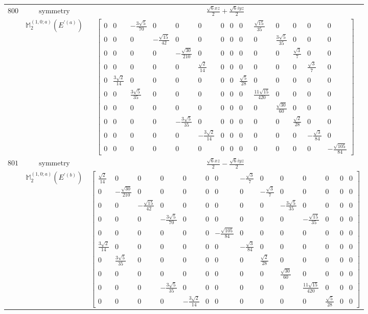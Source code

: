 \documentclass[fleqn,8pt,landscape]{jsarticle}
\begin{document}
\begin{longtable}{ccc}
$ 800 $ & $ \text{symmetry} $ & $ \frac{\sqrt{6} x z}{2} + \frac{\sqrt{6} i y z}{2} $ \\
$  $ & $ \mathbb{M}_{2}^{(1,0;a)}(E^{\prime(a)}) $ & $ \begin{bmatrix} 0 & 0 & - \frac{3 \sqrt{5}}{70} & 0 & 0 & 0 & 0 & 0 & 0 & \frac{\sqrt{15}}{35} & 0 & 0 & 0 & 0 \\ 0 & 0 & 0 & - \frac{\sqrt{15}}{42} & 0 & 0 & 0 & 0 & 0 & 0 & \frac{3 \sqrt{5}}{35} & 0 & 0 & 0 \\ 0 & 0 & 0 & 0 & - \frac{\sqrt{30}}{210} & 0 & 0 & 0 & 0 & 0 & 0 & \frac{\sqrt{3}}{7} & 0 & 0 \\ 0 & 0 & 0 & 0 & 0 & \frac{\sqrt{2}}{14} & 0 & 0 & 0 & 0 & 0 & 0 & \frac{\sqrt{3}}{7} & 0 \\ 0 & \frac{3 \sqrt{2}}{14} & 0 & 0 & 0 & 0 & 0 & 0 & \frac{\sqrt{5}}{28} & 0 & 0 & 0 & 0 & 0 \\ 0 & 0 & \frac{3 \sqrt{5}}{35} & 0 & 0 & 0 & 0 & 0 & 0 & \frac{11 \sqrt{15}}{420} & 0 & 0 & 0 & 0 \\ 0 & 0 & 0 & 0 & 0 & 0 & 0 & 0 & 0 & 0 & \frac{\sqrt{30}}{60} & 0 & 0 & 0 \\ 0 & 0 & 0 & 0 & - \frac{3 \sqrt{5}}{35} & 0 & 0 & 0 & 0 & 0 & 0 & \frac{\sqrt{2}}{28} & 0 & 0 \\ 0 & 0 & 0 & 0 & 0 & - \frac{3 \sqrt{2}}{14} & 0 & 0 & 0 & 0 & 0 & 0 & - \frac{\sqrt{3}}{84} & 0 \\ 0 & 0 & 0 & 0 & 0 & 0 & 0 & 0 & 0 & 0 & 0 & 0 & 0 & - \frac{\sqrt{105}}{84} \end{bmatrix} $ \\ \hline
$ 801 $ & $ \text{symmetry} $ & $ \frac{\sqrt{6} x z}{2} - \frac{\sqrt{6} i y z}{2} $ \\
$  $ & $ \mathbb{M}_{2}^{(1,0;a)}(E^{\prime(b)}) $ & $ \begin{bmatrix} \frac{\sqrt{2}}{14} & 0 & 0 & 0 & 0 & 0 & 0 & - \frac{\sqrt{3}}{7} & 0 & 0 & 0 & 0 & 0 & 0 \\ 0 & - \frac{\sqrt{30}}{210} & 0 & 0 & 0 & 0 & 0 & 0 & - \frac{\sqrt{3}}{7} & 0 & 0 & 0 & 0 & 0 \\ 0 & 0 & - \frac{\sqrt{15}}{42} & 0 & 0 & 0 & 0 & 0 & 0 & - \frac{3 \sqrt{5}}{35} & 0 & 0 & 0 & 0 \\ 0 & 0 & 0 & - \frac{3 \sqrt{5}}{70} & 0 & 0 & 0 & 0 & 0 & 0 & - \frac{\sqrt{15}}{35} & 0 & 0 & 0 \\ 0 & 0 & 0 & 0 & 0 & 0 & - \frac{\sqrt{105}}{84} & 0 & 0 & 0 & 0 & 0 & 0 & 0 \\ \frac{3 \sqrt{2}}{14} & 0 & 0 & 0 & 0 & 0 & 0 & - \frac{\sqrt{3}}{84} & 0 & 0 & 0 & 0 & 0 & 0 \\ 0 & \frac{3 \sqrt{5}}{35} & 0 & 0 & 0 & 0 & 0 & 0 & \frac{\sqrt{2}}{28} & 0 & 0 & 0 & 0 & 0 \\ 0 & 0 & 0 & 0 & 0 & 0 & 0 & 0 & 0 & \frac{\sqrt{30}}{60} & 0 & 0 & 0 & 0 \\ 0 & 0 & 0 & - \frac{3 \sqrt{5}}{35} & 0 & 0 & 0 & 0 & 0 & 0 & \frac{11 \sqrt{15}}{420} & 0 & 0 & 0 \\ 0 & 0 & 0 & 0 & - \frac{3 \sqrt{2}}{14} & 0 & 0 & 0 & 0 & 0 & 0 & \frac{\sqrt{5}}{28} & 0 & 0 \end{bmatrix} $ \\ \hline

\end{longtable}
\end{document}
